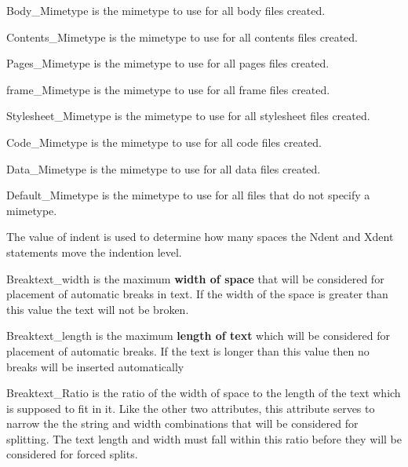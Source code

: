 \begin{description}

Body\_Mimetype is the mimetype to use for all body files created.


Contents\_Mimetype is the mimetype to use for all contents files created.


Pages\_Mimetype is the mimetype to use for all pages files created.


frame\_Mimetype is the mimetype to use for all frame files created.


Stylesheet\_Mimetype is the mimetype to use for all stylesheet files created.


Code\_Mimetype is the mimetype to use for all code files created.


Data\_Mimetype is the mimetype to use for all data files created.


Default\_Mimetype is the mimetype to use for all files that do not specify a mimetype.


The value of indent is used to determine how many spaces the Ndent and Xdent statements
move the indention level.


Breaktext\_width is the maximum {\bfseries width of space} that will
be considered for placement of automatic breaks in text.  If the width
of the space is greater than this value the text will not be broken.


Breaktext\_length is the maximum {\bfseries length of text} which will be considered for placement 
of automatic breaks.  If the text is longer than this value then no breaks will be inserted
automatically


Breaktext\_Ratio is the ratio of the width of space to the length of the text which is supposed to fit in it.  Like the other two attributes, this attribute serves to narrow the the string and
width combinations that will be considered for splitting.  The text length and width must fall
within this ratio before they will be considered for forced splits.



\end{description}
